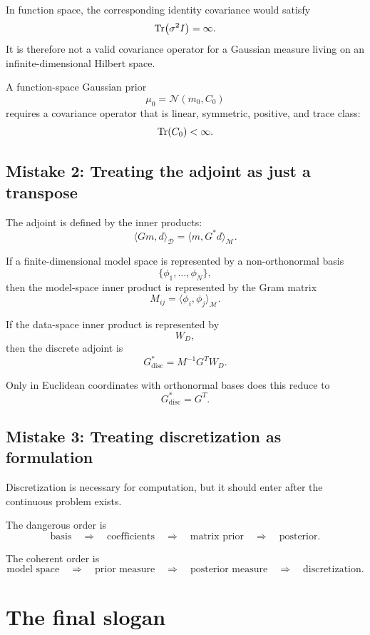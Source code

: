 \documentclass[11pt,a4paper]{book}
\newcommand{\M}{\mathcal{M}}      %
\newcommand{\D}{\mathcal{D}}      %
\newcommand{\prior}{\mu_0}
\newcommand{\G}{G}
\newcommand{\Gadj}{G^\ast}
\begin{document}
In function space, the corresponding identity covariance would satisfy
\[
    \Tr(\sigma^2 I)=\infty.
\]
It is therefore not a valid covariance operator for a Gaussian measure living
on an infinite-dimensional Hilbert space.

A function-space Gaussian prior
\[
    \prior=\mathcal{N}(m_0,C_0)
\]
requires a covariance operator that is linear, symmetric, positive, and trace
class:
\[
    \Tr(C_0)<\infty.
\]

\subsection*{Mistake 2: Treating the adjoint as just a transpose}

The adjoint is defined by the inner products:
\[
    \langle \G m,d\rangle_{\D}
    =
    \langle m,\Gadj d\rangle_{\M}.
\]

If a finite-dimensional model space is represented by a non-orthonormal basis
\[
    \{\phi_1,\ldots,\phi_N\},
\]
then the model-space inner product is represented by the Gram matrix
\[
    M_{ij}
    =
    \langle \phi_i,\phi_j\rangle_{\M}.
\]

If the data-space inner product is represented by
\[
    W_D,
\]
then the discrete adjoint is
\[
    G^\ast_{\mathrm{disc}}
    =
    M^{-1}G^T W_D.
\]

Only in Euclidean coordinates with orthonormal bases does this reduce to
\[
    G^\ast_{\mathrm{disc}}=G^T.
\]

\subsection*{Mistake 3: Treating discretization as formulation}

Discretization is necessary for computation, but it should enter after the
continuous problem exists.

The dangerous order is
\[
    \text{basis}
    \quad\Rightarrow\quad
    \text{coefficients}
    \quad\Rightarrow\quad
    \text{matrix prior}
    \quad\Rightarrow\quad
    \text{posterior}.
\]

The coherent order is
\[
    \text{model space}
    \quad\Rightarrow\quad
    \text{prior measure}
    \quad\Rightarrow\quad
    \text{posterior measure}
    \quad\Rightarrow\quad
    \text{discretization}.
\]

\section{The final slogan}
\end{document}
